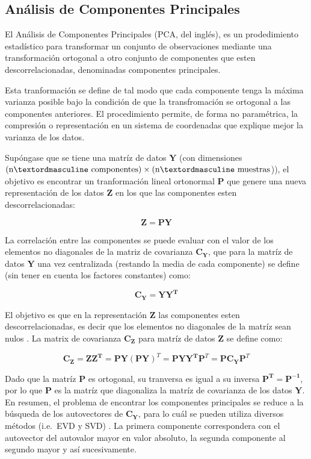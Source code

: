 \documentclass{article}
\begin{document}
    \subsection{Análisis de Componentes Principales}


    El Análisis de Componentes Principales (PCA, del inglés), es un
prodedimiento estadístico para transformar un conjunto de observaciones
mediante una transformación ortogonal a otro conjunto de componentes que
esten descorrelacionadas, denominadas componentes principales.

Esta tranformación se define de tal modo que cada componente tenga la
máxima varianza posible bajo la condición de que la transfromación se
ortogonal a las componentes anteriores. El procedimiento permite, de
forma no paramétrica, la compresión o representación en un sistema de
coordenadas que explique mejor la varianza de los datos.

Supóngase que se tiene una matríz de datos \(\mathbf{Y}\) (con
dimensiones \((\rm{nº~componentes}) \times (\rm{nº~muestras}\))), el
objetivo es encontrar un tranformación lineal ortonormal \(\mathbf{P}\)
que genere una nueva representación de los datos \(\mathbf{Z}\) en los
que las componentes esten descorrelacionadas:

\[ \mathbf{Z} = \mathbf{P} \mathbf{Y} \]

La correlación entre las componentes se puede evaluar con el valor de
los elementos no diagonales de la matriz de covarianza \(\mathbf{C_Y}\),
que para la matríz de datos \(\mathbf{Y}\) una vez centralizada
(restando la media de cada componente) se define (sin tener en cuenta
los factores constantes) como:

\[ \mathbf{C_Y} = \mathbf{Y} \mathbf{Y^T} \]

El objetivo es que en la representación \(\mathbf{Z}\) las componentes
esten descorrelacionadas, es decir que los elementos no diagonales de la
matríz sean nulos \cite{jolliffe2005principal}. La matrix de covarianza
\(\mathbf{C_Z}\) para matríz de datos \(\mathbf{Z}\) se define como:

\[ \mathbf{C_Z} = \mathbf{Z} \mathbf{Z^T} = \mathbf{P} \mathbf{Y} (\mathbf{P} \mathbf{Y})^T =
\mathbf{P} \mathbf{Y} \mathbf{Y^T} \mathbf{P}^T = \mathbf{P} \mathbf{C_Y} \mathbf{P}^T \]

Dado que la matríz \(\mathbf{P}\) es ortogonal, su tranversa es igual a
su inversa \(\mathbf{P^T}=\mathbf{P^{-1}}\), por lo que \(\mathbf{P}\)
es la matríz que diagonaliza la matríz de covarianza de los datos
\(\mathbf{Y}\). En resumen, el problema de encontrar los componentes
principales se reduce a la búsqueda de los autovectores de
\(\mathbf{C_Y}\), para lo cuál se pueden utiliza diversos métodos
(i.e.~EVD y SVD) . La primera componente correspondera con el autovector
del autovalor mayor en valor absoluto, la segunda componente al segundo
mayor y así sucesivamente.
\end{document}
